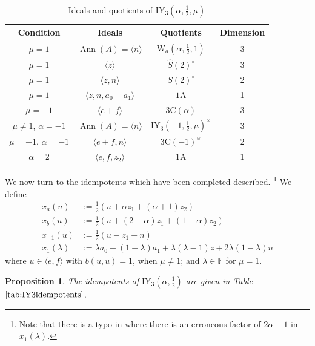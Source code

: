 \documentclass[11pt, a4paper]{article}
\theoremstyle{plain}
\newtheorem{proposition}[theorem]{Proposition}
\theoremstyle{definition}
\newcommand\al{\alpha}
\newcommand\lm{\lambda}
\newcommand\la{\langle}
\newcommand\ra{\rangle}
\DeclareMathOperator{\Ann}{Ann}
\newcommand\FF{\mathbb{F}}
\newcommand{\A}{\mathrm{A}}
\newcommand{\C}{\mathrm{C}}
\newcommand{\IY}{\mathrm{IY}}
\newcommand{\Cl}{\widehat{S}(2)^\circ} %
\newcommand{\0}{\overline{0}}
\newcommand{\2}{\overline{2}}
\newcommand{\1}{\mathbbm{1}}
\begin{document}
\begin{table}[h!tb]
\renewcommand{\arraystretch}{1.5}
\centering
\footnotesize
\begin{tabular}{c|c|c|c}
\hline
Condition  & Ideals & Quotients & Dimension\\
\hline
$\mu=1$ & $\Ann(A) = \la n \ra$ & $\mathrm{W}_a(\al, \frac{1}{2}, 1)$ & 3 \\
$\mu=1$ & $\la z \ra$ & $\Cl$ & 3\\
$\mu=1$ & $\la z, n \ra$ & $S(2)^\circ$ & 2\\
$\mu=1$ & $\la z, n, a_0-a_1 \ra$ & $1\A$ & 1\\
\hline
$\mu = -1$ & $\la e+f \ra$ & $3\C(\al)$ & 3 \\
\hline
$\mu \neq 1$, $\al = -1$ & $\Ann(A) = \la n \ra$ & $\IY_3(-1, \frac{1}{2}, \mu)^\times$ & 3 \\
$\mu =-1$, $\al = -1$ & $\la e+f, n \ra$ & $3\C(-1)^\times$ & 2 \\
\hline
$\al =2$ & $\la e,f,z_2\ra$ & $1\A$ & 1
\end{tabular}
\caption{Ideals and quotients of $\IY_3(\al, \frac{1}{2}, \mu)$}\label{tab:IY3props}
\end{table}

We now turn to the idempotents which have been completed described.  \footnote{Note that there is a typo in \cite[proof of Lemma 7.9]{forbidden} where there is an erroneous factor of $2\al-1$ in $x_1(\lm)$.}  We define
\begin{align*}
x_a(u) &:= \tfrac{1}{2}(u+ \al z_1 + (\al+1)z_2) \\
x_b(u) &:= \tfrac{1}{2}(u+ (2-\al) z_1 + (1-\al)z_2) \\
x_{-1}(u) &:= \tfrac{1}{2}(u - z_1 + n) \\
x_1(\lm) &:= \lm a_0+(1-\lm)a_1+\lm(\lm -1)z+2\lm(1 -\lm)n
\end{align*}
where $u \in \la e,f \ra$ with $b(u,u) = 1$, when $\mu \neq 1$; and $\lm \in \FF$ for $\mu = 1$.

\begin{proposition}\textup{\cite[Theorem 2, Proposition 6.2]{splitspin}\cite[Lemma 7.9]{forbidden}}
The idempotents of $\IY_3(\al, \frac{1}{2})$ are given in Table $\ref{tab:IY3idempotents}$.
\end{proposition}
\end{document}
